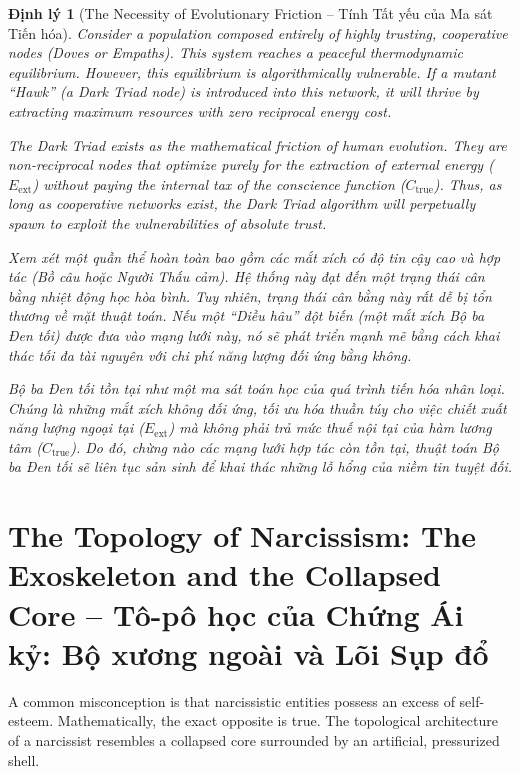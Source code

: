 \documentclass{report}
\newtheorem{dinhly}{Định lý}
\begin{document}
\begin{dinhly}[The Necessity of Evolutionary Friction -- Tính Tất yếu của Ma sát Tiến hóa]
	Consider a population composed entirely of highly trusting, cooperative nodes (Doves or Empaths). This system reaches a peaceful thermodynamic equilibrium. However, this equilibrium is algorithmically vulnerable. If a mutant ``Hawk'' (a Dark Triad node) is introduced into this network, it will thrive by extracting maximum resources with zero reciprocal energy cost.
	
	The Dark Triad exists as the mathematical friction of human evolution. They are non-reciprocal nodes that optimize purely for the extraction of external energy ($E_{\text{ext}}$) without paying the internal tax of the conscience function ($C_{\text{true}}$). Thus, as long as cooperative networks exist, the Dark Triad algorithm will perpetually spawn to exploit the vulnerabilities of absolute trust.
	
	Xem xét một quần thể hoàn toàn bao gồm các mắt xích có độ tin cậy cao và hợp tác (Bồ câu hoặc Người Thấu cảm). Hệ thống này đạt đến một trạng thái cân bằng nhiệt động học hòa bình. Tuy nhiên, trạng thái cân bằng này rất dễ bị tổn thương về mặt thuật toán. Nếu một ``Diều hâu'' đột biến (một mắt xích Bộ ba Đen tối) được đưa vào mạng lưới này, nó sẽ phát triển mạnh mẽ bằng cách khai thác tối đa tài nguyên với chi phí năng lượng đối ứng bằng không.
	
	Bộ ba Đen tối tồn tại như một ma sát toán học của quá trình tiến hóa nhân loại. Chúng là những mắt xích không đối ứng, tối ưu hóa thuần túy cho việc chiết xuất năng lượng ngoại tại ($E_{\text{ext}}$) mà không phải trả mức thuế nội tại của hàm lương tâm ($C_{\text{true}}$). Do đó, chừng nào các mạng lưới hợp tác còn tồn tại, thuật toán Bộ ba Đen tối sẽ liên tục sản sinh để khai thác những lỗ hổng của niềm tin tuyệt đối.
\end{dinhly}

\section{The Topology of Narcissism: The Exoskeleton and the Collapsed Core -- Tô-pô học của Chứng Ái kỷ: Bộ xương ngoài và Lõi Sụp đổ}

A common misconception is that narcissistic entities possess an excess of self-esteem. Mathematically, the exact opposite is true. The topological architecture of a narcissist resembles a collapsed core surrounded by an artificial, pressurized shell.
\end{document}
